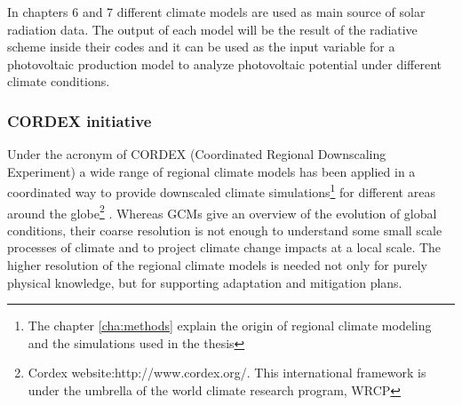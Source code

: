 



In chapters 6 and 7 different climate models are used as main source of solar radiation data. The output of each model will be the result of the radiative scheme inside their codes and it can be used as the input variable for a photovoltaic production model to analyze photovoltaic potential under different climate conditions.

\subsubsection{CORDEX initiative}

Under the acronym of CORDEX (Coordinated Regional Downscaling Experiment) a wide range of regional climate models has been applied in a coordinated way to provide downscaled climate simulations\footnote{The chapter \ref{cha:methods} explain the origin of regional climate modeling and the simulations used in the thesis} for different areas around the globe\footnote{Cordex website:http://www.cordex.org/. This international framework is under the umbrella of the world climate research program, WRCP} . Whereas GCMs give an overview of the evolution of global conditions, their coarse resolution is not enough to understand some small scale processes of climate and to project climate change impacts at a local scale. The higher resolution of the regional climate models is needed not only for purely physical knowledge, but for supporting adaptation and mitigation plans.
 
